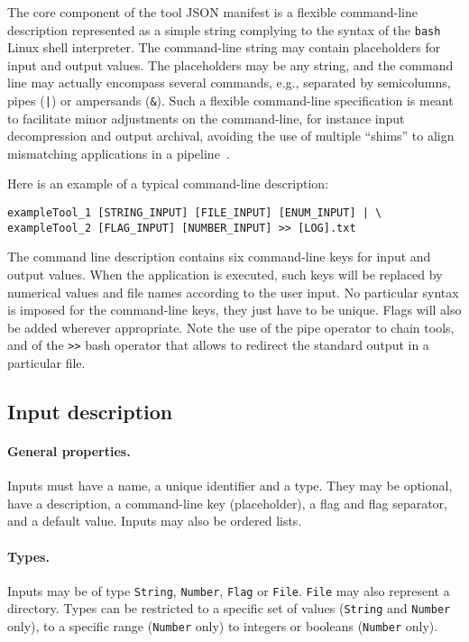 \documentclass{article}
\begin{document}
The core component of the tool JSON manifest is a flexible
command-line description represented as a simple string complying to
the syntax of the \texttt{bash} Linux shell interpreter. The
command-line string may contain placeholders for input and output
values. The placeholders may be any string, and the command line may
actually encompass several commands, e.g., separated by semicolumns,
pipes (\texttt{|}) or ampersands (\texttt{\&}). Such a flexible
command-line specification is meant to facilitate minor adjustments on
the command-line, for instance input decompression and output
archival, avoiding the use of multiple ``shims'' to align mismatching
applications in a pipeline~\cite{hull2004treating}.

Here is an example of a typical command-line description:
\begin{verbatim}
exampleTool_1 [STRING_INPUT] [FILE_INPUT] [ENUM_INPUT] | \
exampleTool_2 [FLAG_INPUT] [NUMBER_INPUT] >> [LOG].txt
\end{verbatim}
The command line description contains six command-line keys for input
and output values. When the application is executed, such keys will be
replaced by numerical values and file names according to the user
input. No particular syntax is imposed for the command-line keys, they
just have to be unique. Flags will also be added wherever
appropriate. Note the use of the pipe operator to chain tools, and of
the \texttt{>>} bash operator that allows to redirect the standard
output in a particular file.

\subsection{Input description}

\paragraph{General properties.} Inputs must have a name, a unique
identifier and a type. They may be optional, have a description, a
command-line key (placeholder), a flag and flag separator, and a
default value. Inputs may also be ordered lists. 

\paragraph{Types.} Inputs may be of type \texttt{String},
\texttt{Number}, \texttt{Flag} or \texttt{File}. \texttt{File} may
also represent a directory. Types can be restricted to a specific set
of values (\texttt{String} and \texttt{Number} only), to a specific
range (\texttt{Number} only) to integers or booleans (\texttt{Number}
only).
\end{document}
